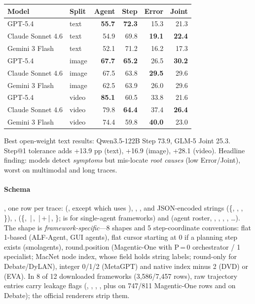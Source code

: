 \begin{center}\footnotesize
\begin{tabular}{@{}llrrrr@{}}\toprule
Model & Split & Agent & Step & Error & Joint\\\midrule
GPT-5.4 & text & \textbf{55.7} & \textbf{72.3} & 15.3 & 21.3\\
Claude Sonnet 4.6 & text & 54.9 & 69.8 & \textbf{19.1} & \textbf{22.4}\\
Gemini 3 Flash & text & 52.1 & 71.2 & 16.2 & 17.3\\\midrule
GPT-5.4 & image & \textbf{67.7} & \textbf{65.2} & 26.5 & \textbf{30.2}\\
Claude Sonnet 4.6 & image & 67.5 & 63.8 & \textbf{29.5} & 29.6\\
Gemini 3 Flash & image & 62.5 & 63.9 & 26.0 & 29.6\\\midrule
GPT-5.4 & video & \textbf{85.1} & 60.5 & 33.8 & 21.6\\
Claude Sonnet 4.6 & video & 79.8 & \textbf{64.4} & 37.4 & \textbf{26.4}\\
Gemini 3 Flash & video & 74.4 & 59.8 & \textbf{40.0} & 23.0\\\bottomrule
\end{tabular}
\end{center}
Best open-weight text results: Qwen3.5-122B Step 73.9, GLM-5 Joint 25.3. Step@1 tolerance adds +13.9 pp (text), +16.9 (image), +28.1 (video). Headline finding: models detect \emph{symptoms} but mis-locate \emph{root causes} (low Error/Joint), worst on multimodal and long traces.

\paragraph{Schema} , one row per trace:  (, except  which uses ), , , and JSON-encoded strings  (\{, , , \}), ,  (\{, \,|\,, \,|\,+\,|\,, \};  is  for single-agent frameworks) and  (agent roster, , , , , \ldots). The  shape is \emph{framework-specific}---8 shapes and 5 step-coordinate conventions: flat 1-based  (ALF-Agent, GUI agents), flat cursor starting at 0 if a planning step exists (smolagents),  round.position (Magentic-One with P\,=\,0 orchestrator / 1 specialist; MacNet node index, whose  field holds string labels; round-only for Debate/DyLAN), integer  0/1/2 (MetaGPT) and native index minus 2 (DVD) or  (EVA). In 8 of 12 downloaded frameworks (3,586/7,457 rows), raw trajectory entries carry leakage flags (, , , , plus  on 747/811 Magentic-One rows and  on Debate); the official renderers strip them.

